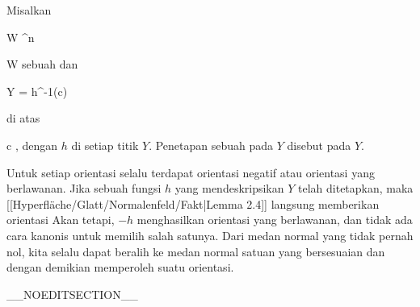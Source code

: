 {}
{

Misalkan

\mavergleichskette
{\vergleichskette
{ W
}
{ \subseteq }{ \R^n
}
{  }{
}
{    }{
}
{   }{
}
}
{}{}{}

 { W } { \R
} {}
sebuah
dan

\mavergleichskette
{\vergleichskette
{ Y
}
{ = }{ h^{-1}(c)
}
{  }{
}
{    }{
}
{   }{
}
}
{}{}{}

di atas

\mavergleichskette
{\vergleichskette
{ c
}
{ \in }{ \R
}
{  }{
}
{    }{
}
{   }{
}
}
{}{}{,}
dengan $h$
di setiap titik $Y$. Penetapan sebuah
pada $Y$ disebut
pada $Y$.

}

Untuk setiap orientasi selalu terdapat orientasi negatif atau orientasi yang berlawanan. Jika sebuah fungsi $h$ yang mendeskripsikan $Y$ telah ditetapkan, maka
[[Hyperfläche/Glatt/Normalenfeld/Fakt|Lemma 2.4]]
langsung memberikan orientasi
 Akan tetapi, $-h$ menghasilkan orientasi yang berlawanan, dan tidak ada cara kanonis untuk memilih salah satunya. Dari medan normal yang tidak pernah nol, kita selalu dapat beralih ke medan normal satuan yang bersesuaian dan dengan demikian memperoleh suatu orientasi.

__NOEDITSECTION__

